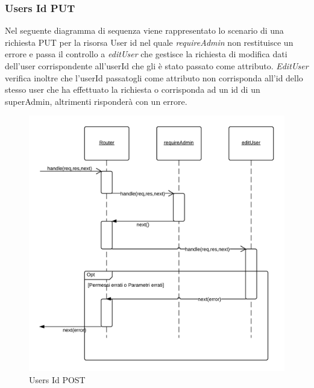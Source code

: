 \subsubsection{Users Id PUT} 
Nel seguente diagramma di sequenza viene rappresentato lo scenario di una richiesta PUT per la risorsa User id nel quale \emph{requireAdmin} non restituisce un errore e passa il controllo a \emph{editUser} che gestisce la richiesta di modifica dati dell'user corrispondente all'userId che gli è stato passato come attributo.
\emph{EditUser} verifica inoltre che l'userId passatogli come attributo non corrisponda all'id dello stesso user che ha effettuato la richiesta o corrisponda ad un id di un superAdmin, altrimenti risponderà con un errore.
\begin{figure}[H]
	\begin{center} 
		\includegraphics[scale=0.20]{scenari/Users Id PUT.png} 
		\caption{Users Id POST}
	\end{center} 
\end{figure}

